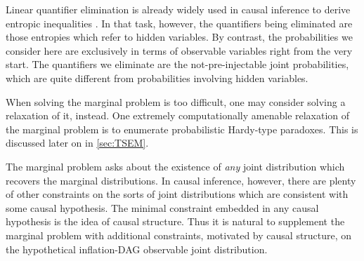 Linear quantifier elimination is already widely used in causal inference to derive entropic inequalities \cite{fritz2013marginal,chaves2014novel,chaves2014informationinference}. In that task, however, the quantifiers being eliminated are those entropies which refer to hidden variables. By contrast, the probabilities we consider here are exclusively in terms of observable variables right from the very start. The quantifiers we eliminate are the not-pre-injectable joint probabilities, which are quite different from probabilities involving hidden variables.

When solving the marginal problem is too difficult, one may consider solving a relaxation of it, instead. One extremely computationally amenable relaxation of the marginal problem is to enumerate probabilistic Hardy-type paradoxes. This is discussed later on in  \cref{sec:TSEM}.




The marginal problem asks about the existence of \emph{any} joint distribution which recovers the marginal distributions. In causal inference, however, there are plenty of other constraints on the sorts of joint distributions which are consistent with some causal hypothesis. The minimal constraint embedded in any causal hypothesis is the idea of causal structure. Thus it is natural to supplement the marginal problem with additional constraints, motivated by causal structure, on the hypothetical inflation-DAG observable joint distribution.

